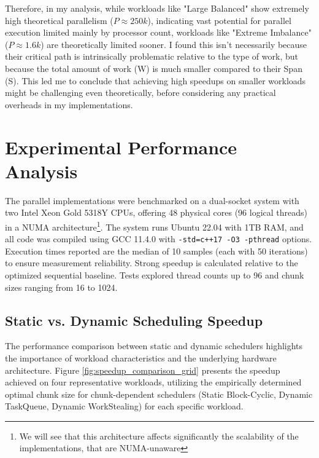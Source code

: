 \documentclass[10pt]{article}
\newcommand{\code}[1]{\texttt{#1}}
\begin{document}
Therefore, in my analysis, while workloads like "Large Balanced" show extremely high theoretical parallelism ($P \approx 250k$), indicating vast potential for parallel execution limited mainly by processor count, workloads like "Extreme Imbalance" ($P \approx 1.6k$) are theoretically limited sooner. I found this isn't necessarily because their critical path is intrinsically problematic relative to the type of work, but because the total amount of work (W) is much smaller compared to their Span (S). This led me to conclude that achieving high speedups on smaller workloads might be challenging even theoretically, before considering any practical overheads in my implementations.


\section{Experimental Performance Analysis}

The parallel implementations were benchmarked on a dual-socket system with two Intel Xeon Gold 5318Y CPUs, offering 48 physical cores (96 logical threads) in a NUMA architecture\footnote{We will see that this architecture affects significantly the scalability of the implementations, that are NUMA-unaware}. The system runs Ubuntu 22.04 with 1TB RAM, and all code was compiled using GCC 11.4.0 with \code{-std=c++17 -O3 -pthread} options. Execution times reported are the median of 10 samples (each with 50 iterations) to ensure measurement reliability. Strong speedup is calculated relative to the optimized sequential baseline. Tests explored thread counts up to 96 and chunk sizes ranging from 16 to 1024.

\subsection{Static vs. Dynamic Scheduling Speedup}
The performance comparison between static and dynamic schedulers highlights the importance of workload characteristics and the underlying hardware architecture. Figure \ref{fig:speedup_comparison_grid} presents the speedup achieved on four representative workloads, utilizing the empirically determined optimal chunk size for chunk-dependent schedulers (Static Block-Cyclic, Dynamic TaskQueue, Dynamic WorkStealing) for each specific workload.
\end{document}
